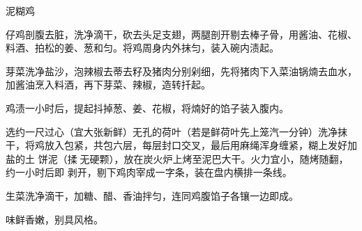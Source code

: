 \begin{recipe}[叫化鸡]{泥糊鸡}

\ingredients


\preparation

\step 仔鸡剖腹去脏，洗净滴干，砍去头足支翅，两腿剖开剔去棒子骨，用酱油、花椒、
料酒、拍松的姜、葱和匀。将鸡周身内外抹匀，装入碗内渍起。

\step 芽菜洗净盐沙，泡辣椒去蒂去籽及猪肉分别剁细，先将猪肉下入菜油锅煵去血水，
加酱油烹入料酒，再下芽菜、辣椒，造转扦起。

\step 鸡渍一小时后，提起抖掉葱、姜、花椒，将煵好的馅子装入腹内。

\step 选约一尺过心（宜大张新鲜）无孔的荷叶（若是鲜荷叶先上笼汽一分钟）洗净抹
干，将鸡放入包紧，共包六层，每层封口交叉，最后用麻绳浑身缠紧，糊上发好加盐的土
饼泥（揉𫃕无硬颗），放在炭火炉上烤至泥巴大干。火力宜小，随烤随翻，约一小时后即
剥开，剔下鸡肉宰成一字条，装在盘内横排一条线。

\step 生菜洗净滴干，加糖、醋、香油拌匀，连同鸡腹馅子各镶一边即成。

\features

味鲜香嫩，别具风格。

\end{recipe}

